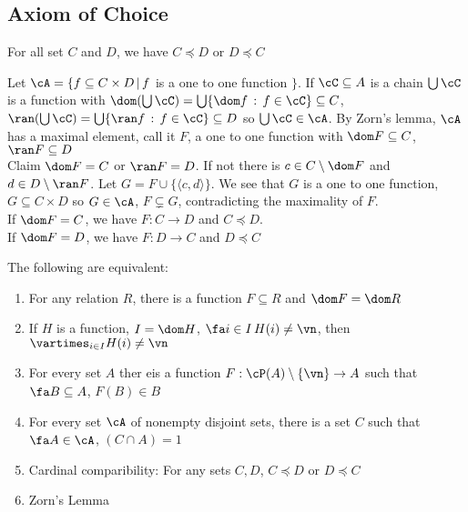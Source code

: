 
\subsection{Axiom of Choice}

\begin{theorem}
    For all set $C$ and $D$, we have $C \preceq D$ or $D \preceq C$ 
\end{theorem}

\begin{pf}
    Let $\cA = \{ f \subseteq C \times D \, | \, f$ is a one to one function $\}$. If $\cC \subseteq A$ is a chain $\bigcup \cC$ is a function with $\dom (\bigcup \cC) = \bigcup \{ \dom f \, : \, f \in \cC\} \subseteq C$, $\ran (\bigcup \cC) = \bigcup \{ \ran f \, : \, f \in \cC\} \subseteq D$ so $\bigcup \cC \in \cA$. By Zorn's lemma, $\cA$ has a maximal element, call it $F$, a one to one function with $\dom F \subseteq C$, $\ran F \subseteq D$ \\
    Claim $\dom F = C$ or $\ran F = D$. If not there is $c \in C \setminus \dom F$ and $d \in D \setminus \ran F$. Let $G = F \cup \{ \langle c, d \rangle \}$. We see that $G$ is a one to one function, $G \subseteq C \times D$ so $G \in \cA$, $F \subsetneq G$, contradicting the maximality of $F$. \\
    If $\dom F = C$, we have $F: C \to D$ and $C \preceq D$. \\
    If $\dom F = D$, we have $F: D \to C$ and $D \preceq C$ 
\end{pf}

\begin{theorem}
    The following are equivalent: 
    \begin{enumerate}
        \item For any relation $R$, there is a function $F \subseteq R$ and $\dom F = \dom R$ 
        \item If $H$ is a function, $I = \dom H$, $\fa i \in I \, H(i) \neq \vn$, then $\vartimes_{i \in I}H(i) \neq \vn$
        \item For every set $A$ ther eis a function $F: \cP(A) \setminus \{\vn\} \to A $ such that $\fa B \subseteq A$, $F(B) \in B$ 
        \item For every set $\cA$ of nonempty disjoint sets, there is a set $C$ such that $\fa A \in \cA$, $(C \cap A) = 1$ 
        \item Cardinal comparibility: For any sets $C, D$, $C \preceq D$ or $D \preceq C$ 
        \item Zorn's Lemma
    \end{enumerate}
\end{theorem}

